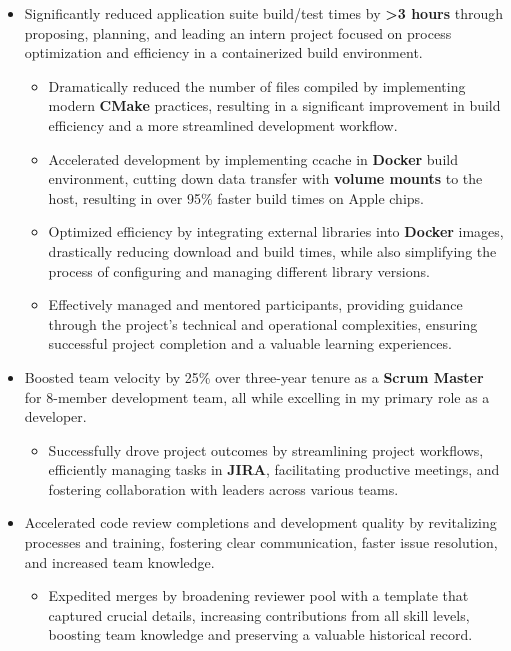 \documentclass[a4paper]{article}
\begin{document}
\begin{itemize}
\begin{itemize}
        \end{itemize}
	\item Significantly reduced application suite build/test times by \textbf{>3 hours} through proposing, planning, and leading an intern project focused on process optimization and efficiency in a containerized build environment.
    \begin{itemize}
	    \item Dramatically reduced the number of files compiled by implementing modern \textbf{CMake} practices, resulting in a significant improvement in build efficiency and a more streamlined development workflow.
	    \item Accelerated development by implementing ccache in \textbf{Docker} build environment, cutting down data transfer with \textbf{volume mounts} to the host, resulting in over 95\% faster build times on Apple chips.
	    \item Optimized efficiency by integrating external libraries into \textbf{Docker} images, drastically reducing download and build times, while also simplifying the process of configuring and managing different library versions.
	    \item Effectively managed and mentored participants, providing guidance through the project's technical and operational complexities, ensuring successful project completion and a valuable learning experiences.
    \end{itemize}
	\item Boosted team velocity by 25\% over three-year tenure as a \textbf{Scrum Master} for 8-member development team, all while excelling in my primary role as a developer.
    \begin{itemize}
	    \item Successfully drove project outcomes by streamlining project workflows, efficiently managing tasks in \textbf{JIRA}, facilitating productive meetings, and fostering collaboration with leaders across various teams.
    \end{itemize}
	\item Accelerated code review completions and development quality by revitalizing processes and training, fostering clear communication, faster issue resolution, and increased team knowledge.
    \begin{itemize}
	    \item Expedited merges by broadening reviewer pool with a template that captured crucial details, increasing contributions from all skill levels, boosting team knowledge and preserving a valuable historical record.

\end{itemize}
\end{itemize}
\end{document}
